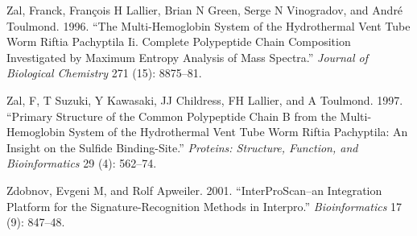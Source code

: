\documentclass[]{article}
\begin{document}
\leavevmode\hypertarget{ref-zal1996multi}{}%
Zal, Franck, François H Lallier, Brian N Green, Serge N Vinogradov, and
André Toulmond. 1996. ``The Multi-Hemoglobin System of the Hydrothermal
Vent Tube Worm Riftia Pachyptila Ii. Complete Polypeptide Chain
Composition Investigated by Maximum Entropy Analysis of Mass Spectra.''
\emph{Journal of Biological Chemistry} 271 (15): 8875--81.

\leavevmode\hypertarget{ref-zal1997primary}{}%
Zal, F, T Suzuki, Y Kawasaki, JJ Childress, FH Lallier, and A Toulmond.
1997. ``Primary Structure of the Common Polypeptide Chain B from the
Multi-Hemoglobin System of the Hydrothermal Vent Tube Worm Riftia
Pachyptila: An Insight on the Sulfide Binding-Site.'' \emph{Proteins:
Structure, Function, and Bioinformatics} 29 (4): 562--74.

\leavevmode\hypertarget{ref-zdobnov2001interproscan}{}%
Zdobnov, Evgeni M, and Rolf Apweiler. 2001. ``InterProScan--an
Integration Platform for the Signature-Recognition Methods in
Interpro.'' \emph{Bioinformatics} 17 (9): 847--48.
\end{document}
